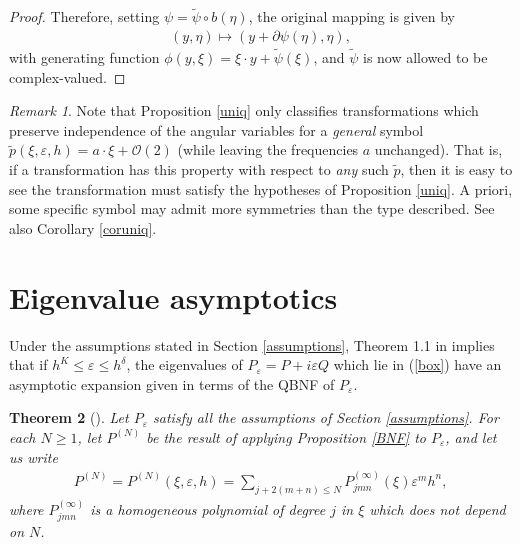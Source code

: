 \documentclass[12pt,lettersize]{article}
\renewcommand{\epsilon}{\varepsilon}
\newcommand{\tw}{\widetilde}%
\theoremstyle{plain}%
\newtheorem{theorem}{Theorem}
\numberwithin{theorem}{section}
\numberwithin{equation}{section}
\theoremstyle{definition}
\theoremstyle{remark}
\newtheorem{remark}[theorem]{Remark}
\begin{document}
{\begin{proof}
Therefore, setting $\psi = \tw \psi \circ b(\eta)$, the original mapping is given by
%
\begin{align*}
(y,\eta) \mapsto (y +\partial \psi(\eta), \eta),
\end{align*}
%
with generating function $\phi(y,\xi) = \xi\cdot y + \tw \psi(\xi)$, and $\tw \psi$ is now allowed to be complex-valued. 

\end{proof}

\begin{remark}
Note that Proposition \ref{uniq} only classifies transformations which preserve independence of the angular variables for a {\it general} symbol $\tw p(\xi,\epsilon,h) = a\cdot \xi + \mathcal{O}(2)$ (while leaving the frequencies $a$ unchanged). That is, if a transformation has this property with respect to {\it any} such $\tw p$, then it is easy to see the transformation must satisfy the hypotheses of Proposition \ref{uniq}. A priori, some specific symbol may admit more symmetries than the type described. See also Corollary \ref{coruniq}.
\end{remark}



\section{Eigenvalue asymptotics}\label{spectralasymptotics}
 
Under the assumptions stated in Section \ref{assumptions}, Theorem 1.1 in \cite{HSV} implies that if $h^K \leq \epsilon\leq h^\delta$, the eigenvalues of $P_\epsilon = P + i\epsilon Q$ which lie in (\ref{box}) have an asymptotic expansion given in terms of the QBNF of $P_\epsilon$. 

\begin{theorem}[\cite{HSV}]\label{hsvthm}
  Let $P_\epsilon$ satisfy all the assumptions of Section \ref{assumptions}. For each $N \geq 1$, let $P^{(N)}$ be the result of applying Proposition \ref{BNF} to $P_\epsilon$, and let us write
%
\begin{align}\label{spec}
P^{(N)} = P^{(N)}(\xi,\epsilon,h) = \sum_{j+2(m+n) \leq N} P^{(\infty)}_{jmn}(\xi)\epsilon^m h^n,
\end{align}
%
where $P^{(\infty)}_{jmn}$ is a homogeneous polynomial of degree $j$ in $\xi$ which does not depend on $N$.


\end{theorem}}
\end{document}
